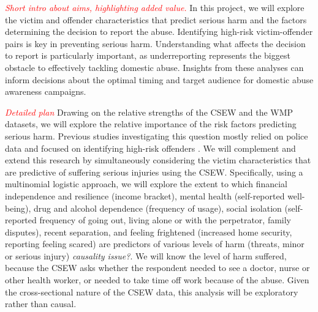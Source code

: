 \documentclass[11pt, a4paper]{article}
\begin{document}
 \textcolor{red}{\textit{Short intro about aims, highlighting added value.}} In this project, we will explore the victim and offender characteristics that predict serious harm and the factors determining the decision to report the abuse. Identifying high-risk victim-offender pairs is key in preventing serious harm. Understanding what affects the decision to report is particularly important, as underreporting represents the biggest obstacle to effectively tackling domestic abuse. Insights from these analyses can inform decisions about the optimal timing and target audience for domestic abuse awareness campaigns.
%
%
%
%

\textcolor{red}{\textit{Detailed plan}} Drawing on the relative strengths of the CSEW and the WMP datasets, we will explore the relative importance of the risk factors predicting serious harm. Previous studies investigating this question mostly relied on police data and focused on identifying high-risk offenders \cite{thornton}. We will complement and extend this research by simultaneously considering the victim characteristics that are predictive of suffering serious injuries using the CSEW. Specifically, using a multinomial logistic approach, we will explore the extent to which financial independence and resilience (income bracket), mental health (self-reported well-being), drug and alcohol dependence (frequency of usage), social isolation (self-reported frequency of going out, living alone or with the perpetrator, family disputes), recent separation, and feeling frightened (increased home security, reporting feeling scared) are predictors of various levels of harm (threats, minor or serious injury) \textit{causality issue?}. We will know the level of harm suffered, because the CSEW asks whether the respondent needed to see a doctor, nurse or other health worker, or needed to take time off work because of the abuse. Given the cross-sectional nature of the CSEW data, this analysis will be exploratory rather than causal.
\end{document}
